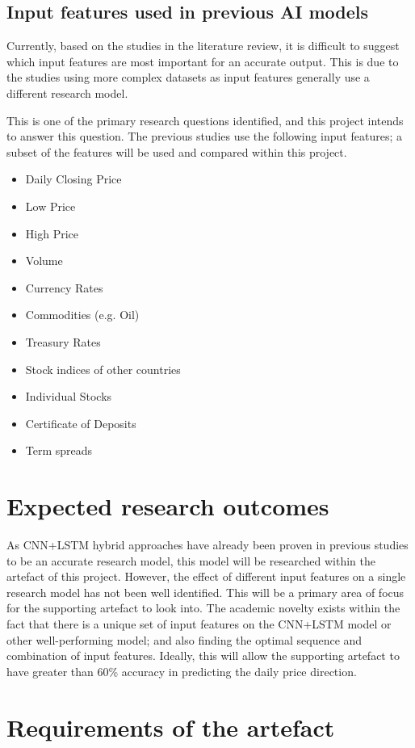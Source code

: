 \subsection{Input features used in previous AI models}
Currently, based on the studies in the literature review, it is difficult to suggest which input features
are most important for an accurate output. This is due to the studies using more complex datasets as input
features generally use a different research model.

This is one of the primary research questions identified, and this project intends to answer this question.
The previous studies use the following input features; a subset of the features will be used and compared
within this project. 
\begin{itemize}
    \item Daily Closing Price
    \item Low Price
    \item High Price
    \item Volume
    \item Currency Rates
    \item Commodities (e.g. Oil)
    \item Treasury Rates
    \item Stock indices of other countries
    \item Individual Stocks
    \item Certificate of Deposits
    \item Term spreads
\end{itemize}

\section{Expected research outcomes}
As CNN+LSTM hybrid approaches have already been proven in previous studies to be an accurate research model,
this model will be researched within the artefact of this project. However, the effect of different input
features on a single research model has not been well identified. This will be a primary area of focus for
the supporting artefact to look into. The academic novelty exists within the fact that
there is a unique set of input features on the CNN+LSTM model or other well-performing model; and also finding the optimal sequence and
combination of input features. Ideally, this will allow the supporting artefact to have greater than
60\% accuracy in predicting the daily price direction.

\section{Requirements of the artefact}
